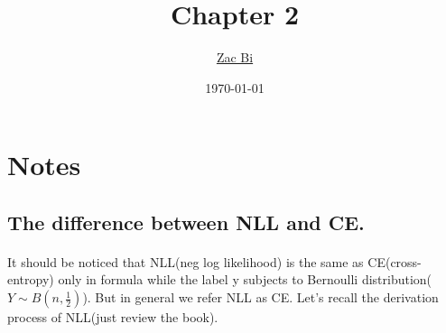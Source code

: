 \documentclass{article}
\begin{document}
\begin{titlepage}
    \title{Chapter 2}
    \author{\href{https://github.com/ZacBi}{Zac Bi}}
    \date{\today}
    \maketitle
    \pagestyle{empty}
\end{titlepage}


\section{Notes}

\subsection{The difference between NLL and CE.}

\paragraph*{}
It should be noticed that NLL(neg log likelihood) is the same as CE(cross-entropy)
only in formula while the label y subjects to Bernoulli distribution($Y \sim B(n, \frac{1}{2}) $).
But in general we refer NLL as CE. Let's recall the derivation process of NLL(just review the book).
\end{document}
